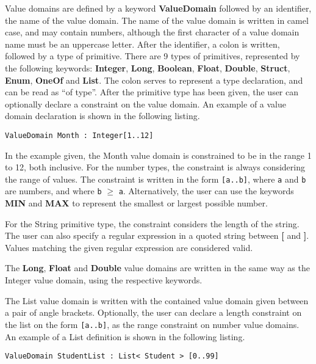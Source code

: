 Value domains are defined by a keyword \textbf{ValueDomain} followed
by an identifier, the name of the value domain. The name of the value
domain is written in camel case, and may contain numbers, although
the first character of a value domain name must be an uppercase letter.
After the identifier, a colon is written, followed by a type of primitive.
There are 9 types of primitives, represented by the following keywords:
\textbf{Integer}, \textbf{Long}, \textbf{Boolean}, \textbf{Float},
\textbf{Double}, \textbf{Struct}, \textbf{Enum}, \textbf{OneOf} and
\textbf{List}. The colon serves to represent a type declaration, and
can be read as ``of type''. After the primitive type has been given,
the user can optionally declare a constraint on the value domain.
An example of a value domain declaration is shown in the following
listing. 

\begin{lstlisting}[language=edma]
ValueDomain Month : Integer[1..12]
\end{lstlisting}

In the example given, the Month value domain is constrained to be
in the range 1 to 12, both inclusive. For the number types, the constraint
is always considering the range of values. The constraint is written
in the form \texttt{{[}a..b{]}}, where \texttt{a} and \texttt{b} are
numbers, and where \texttt{b} $\geq$ \texttt{a}. Alternatively, the
user can use the keywords \textbf{MIN} and \textbf{MAX} to represent
the smallest or largest possible number. 

For the String primitive type, the constraint considers the length
of the string. The user can also specify a regular expression in a
quoted string between \textbf{{[}} and \textbf{{]}}. Values matching
the given regular expression are considered valid.

The \textbf{Long}, \textbf{Float} and \textbf{Double} value domains
are written in the same way as the Integer value domain, using the
respective keywords.

The List value domain is written with the contained value domain given
between a pair of angle brackets. Optionally, the user can declare
a length constraint on the list on the form \texttt{{[}a..b{]}}, as
the range constraint on number value domains. An example of a List
definition is shown in the following listing.

\begin{lstlisting}[language=edma]
ValueDomain StudentList : List< Student > [0..99]
\end{lstlisting}


